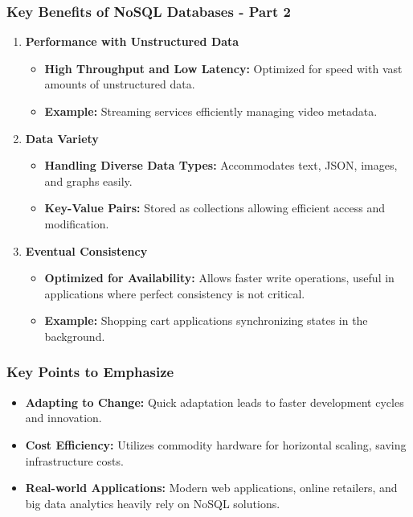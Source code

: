 \documentclass[aspectratio=169]{beamer}
\begin{document}
\begin{frame}[fragile]
    \frametitle{Key Benefits of NoSQL Databases - Part 2}
    \begin{enumerate}[resume]
        \item \textbf{Performance with Unstructured Data}
            \begin{itemize}
                \item \textbf{High Throughput and Low Latency:} Optimized for speed with vast amounts of unstructured data.
                \item \textbf{Example:} Streaming services efficiently managing video metadata.
            \end{itemize}
            
        \item \textbf{Data Variety}
            \begin{itemize}
                \item \textbf{Handling Diverse Data Types:} Accommodates text, JSON, images, and graphs easily.
                \item \textbf{Key-Value Pairs:} Stored as collections allowing efficient access and modification.
            \end{itemize}
            
        \item \textbf{Eventual Consistency}
            \begin{itemize}
                \item \textbf{Optimized for Availability:} Allows faster write operations, useful in applications where perfect consistency is not critical.
                \item \textbf{Example:} Shopping cart applications synchronizing states in the background.
            \end{itemize}
    \end{enumerate}
\end{frame}

\begin{frame}[fragile]
    \frametitle{Key Points to Emphasize}
    \begin{itemize}
        \item \textbf{Adapting to Change:} Quick adaptation leads to faster development cycles and innovation.
        \item \textbf{Cost Efficiency:} Utilizes commodity hardware for horizontal scaling, saving infrastructure costs.
        \item \textbf{Real-world Applications:} Modern web applications, online retailers, and big data analytics heavily rely on NoSQL solutions.
    \end{itemize}
\end{frame}
\end{document}
